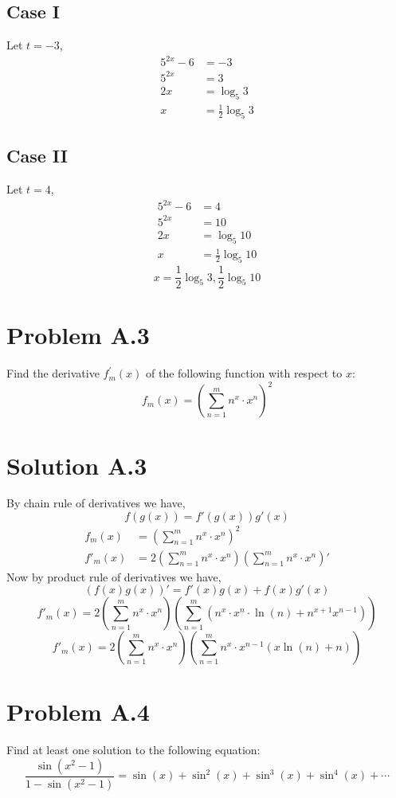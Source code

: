 \documentclass{article}
\begin{document}
\subsection*{Case I}
Let $t=-3$,
\begin{align*}
    5^{2x}-6&=-3 \\
    5^{2x}&=3 \\
    2x &= \log_5{3} \\
    x &= \frac{1}{2}\log_5{3}
\end{align*}
\subsection*{Case II}
Let $t=4$,
\begin{align*}
    5^{2x}-6&=4 \\
    5^{2x}&=10 \\
    2x&=\log_5{10} \\
    x&=\frac{1}{2}\log_5{10}
\end{align*}
\[\boxed{x=\frac{1}{2}\log_5{3}, \frac{1}{2}\log_5{10}}\]

\newpage
\section*{Problem A.3}
Find the derivative $f_{m}^{\prime}(x)$ of the following function with respect to $x$:
\[
f_{m}(x)={\left(\sum_{n=1}^{m} n^{x} \cdot x^{n}\right)}^{2}
\]
\section*{Solution A.3}
By chain rule of derivatives we have,
\[f(g(x))=f'(g(x))g'(x)\]
\begin{align*}
    f_m(x)&={\left(\sum\limits_{n=1}^{m}n^x\cdot x^n\right)}^2 \\
    f'_m(x)&=2\left(\sum\limits_{n=1}^{m}n^x\cdot x^n\right)\left(\sum\limits_{n=1}^{m}n^x\cdot x^n\right)'
\end{align*}
Now by product rule of derivatives we have,
\[\left(f(x)g(x)\right)'=f'(x)g(x)+f(x)g'(x)\]
\[f'_m(x)=2\left(\sum_{n=1}^{m}n^x\cdot x^n\right)\left(\sum_{n=1}^{m} \left(n^x \cdot x^n \cdot \ln(n) + n^{x+1}x^{n-1}\right)\right)\]
\[\boxed{f'_m(x)=2\left(\sum_{n=1}^{m}n^x\cdot x^n\right)\left(\sum_{n=1}^{m}n^x \cdot x^{n-1} (x \ln(n)+n)\right)}\]

\newpage
\section*{Problem A.4}
Find at least one solution to the following equation:
\[
\frac{\sin \left(x^{2}-1\right)}{1-\sin \left(x^{2}-1\right)}=\sin (x)+\sin ^{2}(x)+\sin ^{3}(x)+\sin ^{4}(x)+\cdots
\]
\end{document}

